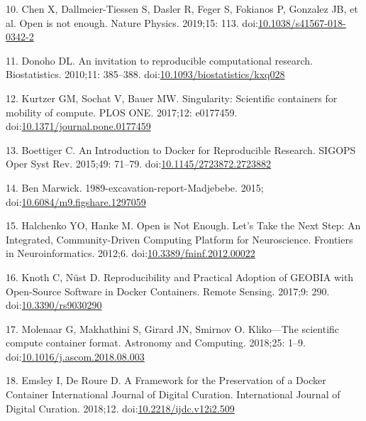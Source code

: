 \documentclass[10pt,letterpaper]{article}
\begin{document}
\leavevmode\hypertarget{ref-chen_open_2019}{}%
10. Chen X, Dallmeier-Tiessen S, Dasler R, Feger S, Fokianos P, Gonzalez
JB, et al. Open is not enough. Nature Physics. 2019;15: 113.
doi:\href{https://doi.org/10.1038/s41567-018-0342-2}{10.1038/s41567-018-0342-2}

\leavevmode\hypertarget{ref-donoho_invitation_2010}{}%
11. Donoho DL. An invitation to reproducible computational research.
Biostatistics. 2010;11: 385--388.
doi:\href{https://doi.org/10.1093/biostatistics/kxq028}{10.1093/biostatistics/kxq028}

\leavevmode\hypertarget{ref-kurtzer_singularity_2017}{}%
12. Kurtzer GM, Sochat V, Bauer MW. Singularity: Scientific containers
for mobility of compute. PLOS ONE. 2017;12: e0177459.
doi:\href{https://doi.org/10.1371/journal.pone.0177459}{10.1371/journal.pone.0177459}

\leavevmode\hypertarget{ref-boettiger_introduction_2015}{}%
13. Boettiger C. An Introduction to Docker for Reproducible Research.
SIGOPS Oper Syst Rev. 2015;49: 71--79.
doi:\href{https://doi.org/10.1145/2723872.2723882}{10.1145/2723872.2723882}

\leavevmode\hypertarget{ref-marwick_madjebebe_2015}{}%
14. Ben Marwick. 1989-excavation-report-Madjebebe. 2015;
doi:\href{https://doi.org/10.6084/m9.figshare.1297059}{10.6084/m9.figshare.1297059}

\leavevmode\hypertarget{ref-halchenko_open_2012}{}%
15. Halchenko YO, Hanke M. Open is Not Enough. Let's Take the Next Step:
An Integrated, Community-Driven Computing Platform for Neuroscience.
Frontiers in Neuroinformatics. 2012;6.
doi:\href{https://doi.org/10.3389/fninf.2012.00022}{10.3389/fninf.2012.00022}

\leavevmode\hypertarget{ref-knoth_reproducibility_2017}{}%
16. Knoth C, Nüst D. Reproducibility and Practical Adoption of GEOBIA
with Open-Source Software in Docker Containers. Remote Sensing. 2017;9:
290. doi:\href{https://doi.org/10.3390/rs9030290}{10.3390/rs9030290}

\leavevmode\hypertarget{ref-molenaar_klikoscientific_2018}{}%
17. Molenaar G, Makhathini S, Girard JN, Smirnov O. Kliko---The
scientific compute container format. Astronomy and Computing. 2018;25:
1--9.
doi:\href{https://doi.org/10.1016/j.ascom.2018.08.003}{10.1016/j.ascom.2018.08.003}

\leavevmode\hypertarget{ref-emsley_framework_2018}{}%
18. Emsley I, De Roure D. A Framework for the Preservation of a Docker
Container International Journal of Digital Curation. International
Journal of Digital Curation. 2018;12.
doi:\href{https://doi.org/10.2218/ijdc.v12i2.509}{10.2218/ijdc.v12i2.509}
\end{document}
